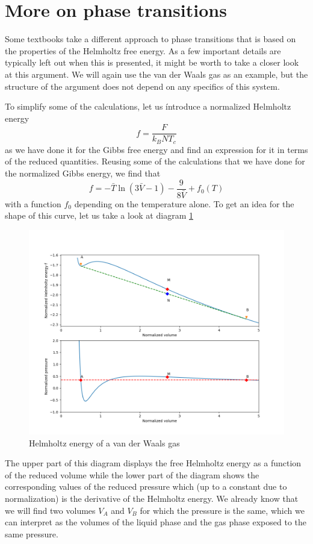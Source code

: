 \documentclass[a4paper, draft]{article}
\theoremstyle{own}
\theoremstyle{remark}
\begin{document}
\section{More on phase transitions}
 
Some textbooks take a different approach to phase transitions that is based on the properties of the Helmholtz free energy. As a few important details are typically left out when this is presented, it might be worth to take a closer look at this argument. We will again use the van der Waals gas as an example, but the structure of the argument does not depend on any specifics of this system. 


To simplify some of the calculations, let us íntroduce a normalized Helmholtz energy
$$
f = \frac{F}{k_B N T_c}
$$
as we have done it for the Gibbs free energy and find an expression for it in terms of the reduced quantities. Reusing some of the calculations that we have done for the normalized Gibbs energy, we find that
$$
f =  - \bar{T} \ln (3\bar{V} - 1) - \frac{9}{8 \bar{V}} + f_0(T)
$$
with a function $f_0$ depending on the temperature alone. To get an idea for the shape of this curve, let us take a look at diagram \ref{fig:VanDerWaalsHelmholtz}

\begin{figure}[ht]
	\centering
	\includegraphics[scale=0.5]{VanDerWaalsHelmholtz}
	\caption{Helmholtz energy of a van der Waals gas}
	\label{fig:VanDerWaalsHelmholtz}
\end{figure}


The upper part of this diagram displays the free Helmholtz energy as a function of the reduced volume while the lower part of the diagram shows the corresponding values of the reduced pressure which (up to a constant due to normalization) is the derivative of the Helmholtz energy. We already know that we will find two volumes $V_A$ and $V_B$ for which the pressure is the same, which we can interpret as the volumes of the liquid phase and the gas phase exposed to the same pressure. 
\end{document}
